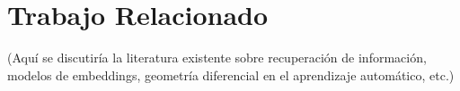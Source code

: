 \section{Trabajo Relacionado}
(Aquí se discutiría la literatura existente sobre recuperación de información, modelos de embeddings, geometría diferencial en el aprendizaje automático, etc.)
